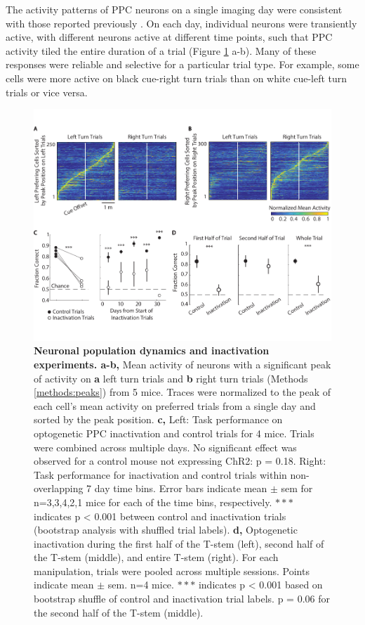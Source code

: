 The activity patterns of PPC neurons on a single imaging day were consistent with those reported previously \citep{Harvey:2012du, Morcos2016}. On each day, individual neurons were transiently active, with different neurons active at different time points, such that PPC activity tiled the entire duration of a trial (Figure \ref{fig:1_seq_inact} a-b). Many of these responses were reliable and selective for a particular trial type. For example, some cells were more active on black cue-right turn trials than on white cue-left turn trials or vice versa.

\begin{figure}
\includegraphics[width=\textwidth]{figures/1_seq_inact.pdf}
\caption[Neuronal population dynamics and inactivation experiments.]{\textbf{Neuronal population dynamics and inactivation experiments. a-b,} Mean activity of neurons with a significant peak of activity on \textbf{a} left turn trials and \textbf{b} right turn trials (Methods \ref{methods:peaks}) from 5 mice. Traces were normalized to the peak of each cell's mean activity on preferred trials from a single day and sorted by the peak position. 
%
\textbf{c,} Left: Task performance on optogenetic PPC inactivation and control trials for 4 mice. Trials were combined across multiple days. No significant effect was observed for a control mouse not expressing ChR2: p = 0.18. Right: Task performance for inactivation and control trials within non-overlapping 7 day time bins. Error bars indicate mean $\pm$ sem for n=3,3,4,2,1 mice for each of the time bins, respectively. $***$ indicates p < 0.001 between control and inactivation trials (bootstrap analysis with shuffled trial labels).
%
\textbf{d,} Optogenetic inactivation during the first half of the T-stem (left), second half of the T-stem (middle), and entire T-stem (right). For each manipulation, trials were pooled across multiple sessions. Points indicate mean $\pm$ sem. n=4 mice. $***$ indicates p < 0.001 based on bootstrap shuffle of control and inactivation trial labels. p = 0.06 for the second half of the T-stem (middle).
\label{fig:1_seq_inact}}
\end{figure}

